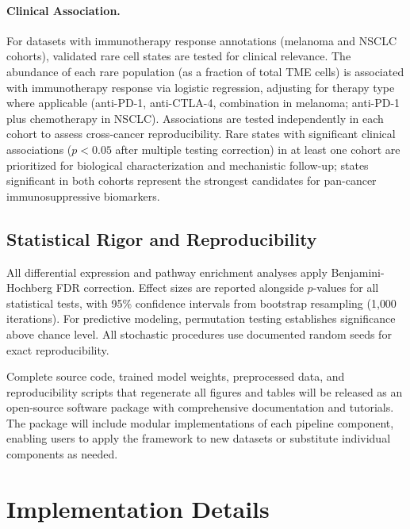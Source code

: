 \documentclass{article}
\begin{document}
\paragraph{Clinical Association.} For datasets with immunotherapy response annotations (melanoma and NSCLC cohorts), validated rare cell states are tested for clinical relevance. The abundance of each rare population (as a fraction of total TME cells) is associated with immunotherapy response via logistic regression, adjusting for therapy type where applicable (anti-PD-1, anti-CTLA-4, combination in melanoma; anti-PD-1 plus chemotherapy in NSCLC). Associations are tested independently in each cohort to assess cross-cancer reproducibility. Rare states with significant clinical associations ($p < 0.05$ after multiple testing correction) in at least one cohort are prioritized for biological characterization and mechanistic follow-up; states significant in both cohorts represent the strongest candidates for pan-cancer immunosuppressive biomarkers.


\subsection{Statistical Rigor and Reproducibility}

All differential expression and pathway enrichment analyses apply Benjamini-Hochberg FDR correction. Effect sizes are reported alongside $p$-values for all statistical tests, with 95\% confidence intervals from bootstrap resampling (1{,}000 iterations). For predictive modeling, permutation testing establishes significance above chance level. All stochastic procedures use documented random seeds for exact reproducibility.

Complete source code, trained model weights, preprocessed data, and reproducibility scripts that regenerate all figures and tables will be released as an open-source software package with comprehensive documentation and tutorials. The package will include modular implementations of each pipeline component, enabling users to apply the framework to new datasets or substitute individual components as needed.



\appendix

\section{Implementation Details}
\label{app:implementation}
\end{document}

